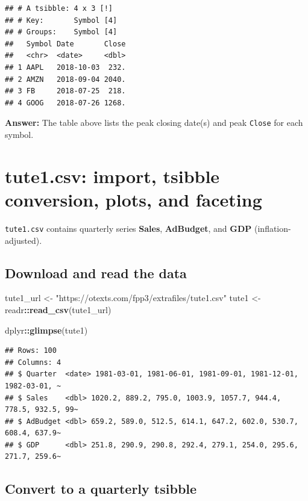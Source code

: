 \documentclass[
  11pt,
]{article}
\newenvironment{Shaded}{\begin{snugshade}}{\end{snugshade}}
\newcommand{\FunctionTok}[1]{\textcolor[rgb]{0.13,0.29,0.53}{\textbf{#1}}}
\newcommand{\NormalTok}[1]{#1}
\newcommand{\OtherTok}[1]{\textcolor[rgb]{0.56,0.35,0.01}{#1}}
\newcommand{\SpecialCharTok}[1]{\textcolor[rgb]{0.81,0.36,0.00}{\textbf{#1}}}
\newcommand{\StringTok}[1]{\textcolor[rgb]{0.31,0.60,0.02}{#1}}
\begin{document}
\begin{verbatim}
## # A tsibble: 4 x 3 [!]
## # Key:       Symbol [4]
## # Groups:    Symbol [4]
##   Symbol Date       Close
##   <chr>  <date>     <dbl>
## 1 AAPL   2018-10-03  232.
## 2 AMZN   2018-09-04 2040.
## 3 FB     2018-07-25  218.
## 4 GOOG   2018-07-26 1268.
\end{verbatim}

\textbf{Answer:} The table above lists the peak closing date(s) and peak
\texttt{Close} for each symbol.

\section{tute1.csv: import, tsibble conversion, plots, and
faceting}\label{tute1.csv-import-tsibble-conversion-plots-and-faceting}

\texttt{tute1.csv} contains quarterly series \textbf{Sales},
\textbf{AdBudget}, and \textbf{GDP} (inflation-adjusted).

\subsection{Download and read the
data}\label{download-and-read-the-data}

\begin{Shaded}
\begin{Highlighting}[]
\NormalTok{tute1\_url }\OtherTok{\textless{}{-}} \StringTok{"https://otexts.com/fpp3/extrafiles/tute1.csv"}
\NormalTok{tute1 }\OtherTok{\textless{}{-}}\NormalTok{ readr}\SpecialCharTok{::}\FunctionTok{read\_csv}\NormalTok{(tute1\_url)}

\NormalTok{dplyr}\SpecialCharTok{::}\FunctionTok{glimpse}\NormalTok{(tute1)}
\end{Highlighting}
\end{Shaded}

\begin{verbatim}
## Rows: 100
## Columns: 4
## $ Quarter  <date> 1981-03-01, 1981-06-01, 1981-09-01, 1981-12-01, 1982-03-01, ~
## $ Sales    <dbl> 1020.2, 889.2, 795.0, 1003.9, 1057.7, 944.4, 778.5, 932.5, 99~
## $ AdBudget <dbl> 659.2, 589.0, 512.5, 614.1, 647.2, 602.0, 530.7, 608.4, 637.9~
## $ GDP      <dbl> 251.8, 290.9, 290.8, 292.4, 279.1, 254.0, 295.6, 271.7, 259.6~
\end{verbatim}

\subsection{Convert to a quarterly
tsibble}\label{convert-to-a-quarterly-tsibble}
\end{document}
